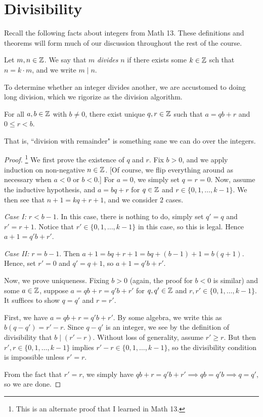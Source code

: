 \documentclass{article}
\begin{document}
\section{Divisibility}
Recall the following facts about integers from Math 13. These definitions and theorems will form much of our discussion throughout the rest of the course.
\begin{definition}
Let $m,n\in\mathbb Z$. We say that $m$ \textit{divides} $n$ if there exists some $k\in\mathbb Z$ sch that $n = k\cdot m$, and we write $m\mid n$.
\end{definition}

To determine whether an integer divides another, we are accustomed to doing long division, which we rigorize as the division algorithm.
\begin{theorem}
For all $a,b\in \mathbb Z$ with $b\neq 0$, there exist unique $q,r\in \mathbb Z$ such that $a = qb+r$ and $0\leq r < b$. 
\end{theorem}

That is, ``division with remainder" is something sane we can do over the integers.
\begin{proof}\footnote{This is an alternate proof that I learned in Math 13.}
We first prove the existence of $q$ and $r$. Fix $b> 0$, and we apply induction on non-negative $n\in\mathbb Z$. [Of course, we flip everything around as necessary when $a<0$ or $b < 0$.] For $a=0$, we simply set $q=r=0$. Now, assume the inductive hypothesis, and $a = bq+r$ for $q\in\mathbb Z$ and $r\in\{0, 1, \ldots, k-1\}$. We then see that $n+1 = kq + r+1$, and we consider $2$ cases.

\textit{Case I:} $r < b-1$. In this case, there is nothing to do, simply set $q' = q$ and $r' = r+1$. Notice that $r' \in \{0, 1, \ldots, k-1\}$ in this case, so this is legal. Hence $a+1 = q'b + r'$.

\textit{Case II:} $r = b-1$. Then $a+1 = bq + r+1 = bq + (b-1)+1 = b(q+1)$. Hence, set $r'=0$ and $q' = q+1$, so $a+1 = q'b + r'$.

Now, we prove uniqueness. Fixing $b>0$ (again, the proof for $b<0$ is similar) and some $a\in\mathbb Z$, suppose $a = qb+r = q'b+r'$ for $q, q'\in \mathbb Z$ and $r, r' \in \{0, 1, \ldots, k-1\}$. It suffices to show $q=q'$ and $r=r'$. 

First, we have $a = qb+r = q'b + r'$. By some algebra, we write this as $b(q - q') = r'-r$. Since $q-q'$ is an integer, we see by the definition of divisibility that $b\mid (r'-r)$. Without loss of generality, assume $r'\geq r$. But then $r',r \in \{0, 1, \ldots, k-1\}$ implies $r'-r \in \{0, 1, \ldots, k-1\}$, so the divisibility condition is impossible unless $r' = r$.

From the fact that $r'=r$, we simply have $qb + r = q'b + r' \implies qb = q'b \implies q=q'$, so we are done.
\end{proof}
\end{document}
